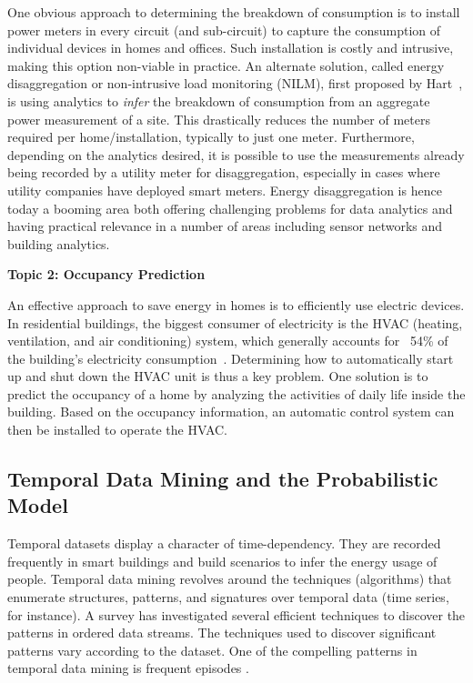 One obvious approach to determining the breakdown of consumption is to install
power meters in every circuit (and sub-circuit)
to capture the consumption of individual devices in homes and
offices. Such installation is costly and intrusive, making 
this option non-viable in practice. 
An alternate
solution, called energy disaggregation or non-intrusive load monitoring
(NILM),
first proposed by Hart~\cite{hart1992}, is using analytics to 
{\em infer} the breakdown of consumption from an aggregate 
power measurement of a
site. This drastically reduces the number of meters required per 
home/installation, typically to just one meter. Furthermore, depending on the analytics desired, it is possible to
use the measurements already being recorded by a utility meter for
disaggregation, especially in cases where utility companies have deployed
smart meters.
Energy disaggregation is hence today a booming area both offering
challenging problems for data analytics and having practical relevance in a
number of areas including sensor networks and building analytics.


\textbf{Topic 2: Occupancy Prediction}

An effective approach to save energy in homes is to 
efficiently use electric devices.  
In residential buildings, 
the biggest consumer of electricity is the HVAC 
(heating, ventilation, and air conditioning) system, which generally accounts for ~54\% 
of the building's electricity consumption~\cite{book2014us}. 
Determining how to automatically start up and shut down the HVAC unit 
is thus a key problem. 
One solution is to predict the occupancy of a home by analyzing the activities of daily life 
inside the building. 
Based on the occupancy information, 
an automatic control system can then be installed
to operate the HVAC. 

\subsection{Temporal Data Mining and the Probabilistic Model}
Temporal datasets display a character of time-dependency. 
They are recorded frequently in smart buildings 
and build scenarios to infer the energy usage of people.
 Temporal data mining revolves around the techniques (algorithms) that enumerate structures, patterns, and signatures over temporal data (time series, for instance). 
 A survey \cite{laxman2006survey} has investigated several efficient 
 techniques to discover the patterns in ordered data streams.  
 The techniques used to discover significant patterns vary according to the dataset. 
 One of the compelling patterns in temporal data mining is frequent episodes \cite{mannila1997discovery}.

